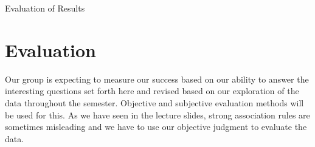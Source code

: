 \documentclass{beamer}
\begin{document}
\begin{frame}[fragile]{Evaluation of Results}

\section{Evaluation}

Our group is expecting to measure our success based on our ability to answer the interesting questions set forth here and revised based on our exploration of the data throughout the semester. Objective and subjective evaluation methods will be used for this. As we have seen in the lecture slides, strong association rules are sometimes misleading and we have to use our objective judgment to evaluate the data.

\end{frame}
\end{document}
